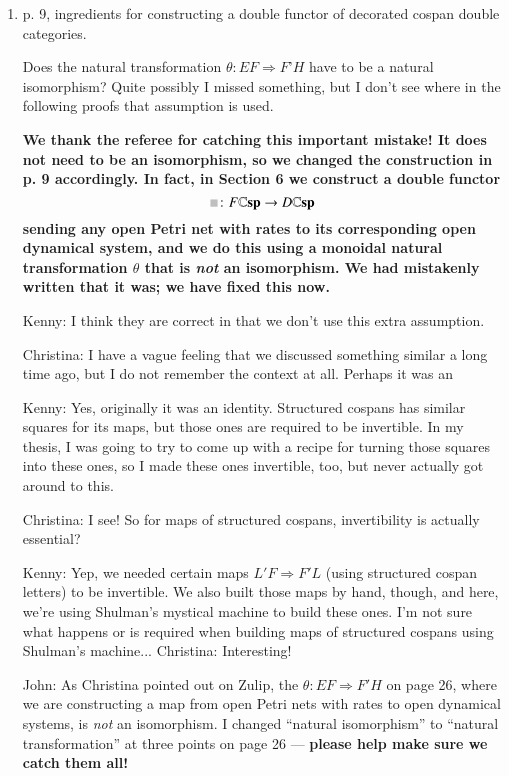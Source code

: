 \documentclass[reqno]{amsart}
\newcommand*{\graysquare}{\textcolor{lightgray}{\blacksquare}}
\newcommand{\double}[1]{\mathbf{\mathbb #1}}
\newcommand{\lCsp}{\double{Csp}}
\def\chris{\color{purple} Christina: }
\def\john{\color{red} John: }
\def\kenny{\color{blue} Kenny: }
\begin{document}
\begin{enumerate}
  

\item p. 9, ingredients for constructing a double functor of decorated cospan double categories.

Does the natural transformation $\theta \colon EF \Rightarrow F’ H$ have to be a natural isomorphism? Quite possibly I missed something, but I don’t see where in 
the following proofs that assumption is used.

{\bf We thank the referee for catching this important mistake!   It does not need to be an isomorphism, so we changed the construction in p. 
9 accordingly. In fact, in Section 6 we construct a double functor
\[      \graysquare \colon F \lCsp \to D \lCsp \]
sending any open Petri net with rates to its corresponding open dynamical system, and we do this
using a monoidal natural transformation $\theta$ that is \emph{not} an isomorphism.  We had mistakenly written that it was; we have fixed this now.}

  

\iffalse
{\kenny I think they are correct in that we don't use this extra assumption.}

{\chris I have a vague feeling that we discussed something similar a long time ago, but I do not remember the context at all. Perhaps it was an 

{\kenny Yes, originally it was an identity. Structured cospans has similar squares for its maps, but those ones are required to be invertible. In my 
thesis, I was going to try to come up with a recipe for turning those squares into these ones, so I made these ones invertible, too, but never 
actually got around to this.}

{\chris I see! So for maps of structured cospans, invertibility is actually essential?}

{\kenny Yep, we needed certain maps $L' F \Rightarrow F' L$ (using structured cospan letters) to be invertible. We also built those maps by hand, 
though, and here, we're using Shulman's mystical machine to build these ones. I'm not sure what happens or is required when building maps of 
structured cospans using Shulman's machine...} {\chris Interesting!}

{\john  As Christina pointed out on Zulip, the $\theta : EF \Rightarrow F'H$ on page 26, where we are
constructing a map from open Petri nets with rates to open dynamical systems, is \emph{not} an
isomorphism.  I changed ``natural isomorphism'' to ``natural transformation'' at three points on page 26 --- 
{\bf please help make sure we catch them all!}

}}
\end{enumerate}
\end{document}
